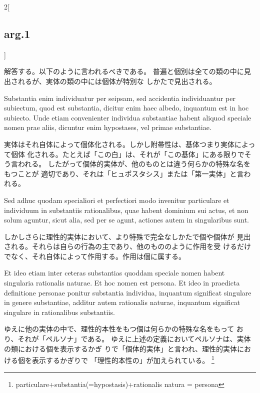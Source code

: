 \documentclass[paper=a4paper,fontsize=10pt,jafontsize=9pt,titlepage]{jlreq}
\begin{document}
\begin{paracol}{2}[\subsection{arg.1}]
\switchcolumn

解答する。以下のように言われるべきである。
普遍と個別は全ての類の中に見出されるが、実体の類の中には個体が特別な
 しかたで見出される。

\switchcolumn*

Substantia enim individuatur per seipsam, sed
accidentia individuantur per subiectum, quod est substantia, dicitur
enim haec albedo, inquantum est in hoc subiecto. Unde etiam convenienter
individua substantiae habent aliquod speciale nomen prae aliis, dicuntur
enim hypostases, vel primae substantiae.

\switchcolumn

実体はそれ自体によって個体化される。しかし附帯性は、基体つまり実体によって個体
 化される。たとえば「この白」は、それが「この基体」にある限りでそう言われる。
 したがって個体的実体が、他のものとは違う何らかの特殊な名をもつことが
 適切であり、それは「ヒュポスタシス」または「第一実体」と言われる。

\switchcolumn*

Sed adhuc quodam specialiori et
perfectiori modo invenitur particulare et individuum in substantiis
rationalibus, quae habent dominium sui actus, et non solum aguntur,
sicut alia, sed per se agunt, actiones autem in singularibus sunt.

\switchcolumn

しかしさらに理性的実体において、より特殊で完全なしかたで個や個体が
 見出される。それらは自らの行為の主であり、他のもののように作用を受
 けるだけでなく、それ自体によって作用する。作用は個に属する。

\switchcolumn*

Et
ideo etiam inter ceteras substantias quoddam speciale nomen habent
singularia rationalis naturae. Et hoc nomen est persona. Et ideo in
praedicta definitione personae ponitur substantia individua, inquantum
significat singulare in genere substantiae, additur autem rationalis
naturae, inquantum significat singulare in rationalibus substantiis.

\switchcolumn

ゆえに他の実体の中で、理性的本性をもつ個は何らかの特殊な名をもって
 おり、それが「ペルソナ」である。
ゆえに上述の定義においてペルソナは、実体の類における個を表示するかぎ
 りで「個体的実体」と言われ、理性的実体における個を表示するかぎりで
 「理性的本性の」が加えられている。
 \footnote{particulare+substantia(=hypostasis)+rationalis natura = persona}

\switchcolumn*[\subsection{ad.1}]


\end{paracol}
\end{document}
